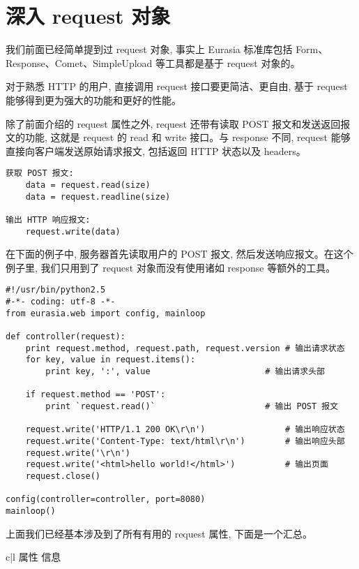 \documentclass{manual}
\begin{document}
\section{深入 request 对象}

我们前面已经简单提到过 request 对象, 事实上 Eurasia 标准库包括 Form、Response、Comet、SimpleUpload 等工具都是基于 request 对象的。

对于熟悉 HTTP 的用户, 直接调用 request 接口要更简洁、更自由, 基于 request 能够得到更为强大的功能和更好的性能。

除了前面介绍的 request 属性之外, request 还带有读取 POST 报文和发送返回报文的功能, 这就是 request 的 read 和 write 接口。与 response 不同, request 能够直接向客户端发送原始请求报文, 包括返回 HTTP 状态以及 headers。

\begin{verbatim}
获取 POST 报文:
	data = request.read(size)
	data = request.readline(size)

输出 HTTP 响应报文:
	request.write(data)
\end{verbatim}

在下面的例子中, 服务器首先读取用户的 POST 报文, 然后发送响应报文。在这个例子里, 我们只用到了 request 对象而没有使用诸如 response 等额外的工具。

\begin{verbatim}
#!/usr/bin/python2.5
#-*- coding: utf-8 -*-
from eurasia.web import config, mainloop

def controller(request):
	print request.method, request.path, request.version # 输出请求状态
	for key, value in request.items():
		print key, ':', value                       # 输出请求头部

	if request.method == 'POST':
		print `request.read()`                      # 输出 POST 报文

	request.write('HTTP/1.1 200 OK\r\n')                # 输出响应状态
	request.write('Content-Type: text/html\r\n')        # 输出响应头部
	request.write('\r\n')
	request.write('<html>hello world!</html>')          # 输出页面
	request.close()

config(controller=controller, port=8080)
mainloop()
\end{verbatim}

上面我们已经基本涉及到了所有有用的 request 属性, 下面是一个汇总。

\begin{tableii}{c|l}{}{ 属性 }{ 信息 }
\end{tableii}
\end{document}
